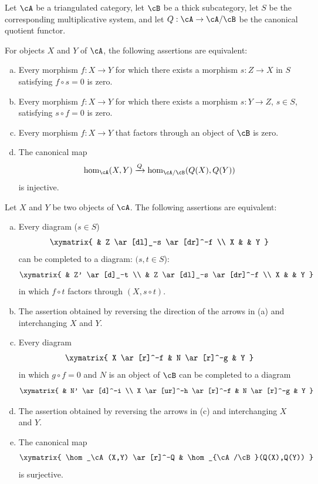 Let $\cA$ be a triangulated category, let $\cB$ be a thick subcategory,
let $S$ be the corresponding multiplicative system, and let
$Q:\cA\to \cA/\cB$ be the canonical quotient functor.

\begin{proposition}\label{VIII:2-5-1}
For objects $X$ and $Y$ of $\cA$, the following assertions are equivalent:
\begin{enumerate}[(a)]
  \item Every morphism $f:X\to Y$ for which there exists a morphism
    $s:Z\to X$ in $S$ satisfying $f\circ s=0$ is zero.
  \item Every morphism $f:X\to Y$ for which there exists a morphism
    $s:Y\to Z$, $s\in S$, satisfying $s\circ f=0$ is zero.
  \item Every morphism $f:X\to Y$ that factors through an object of $\cB$
    is zero.
  \item The canonical map
    \[
      \hom_\cA(X,Y) \xrightarrow{Q} \hom_{\cA/\cB}(Q(X),Q(Y))
    \]
    is injective.
\end{enumerate}
\end{proposition}

\begin{proposition}\label{VIII:2-5-2}
Let $X$ and $Y$ be two objects of $\cA$. The following assertions are
equivalent:
\begin{enumerate}[(a)]
  \item Every diagram ($s\in S$)
    \[\xymatrix{
      & Z \ar[dl]_-s \ar[dr]^-f \\
      X
        & & Y
    }\]
    can be completed to a diagram: $(s,t\in S$):
    \[\xymatrix{
      & Z' \ar[d]_-t \\
      & Z \ar[dl]_-s \ar[dr]^-f \\
      X
        & & Y
    }\]
    in which $f\circ t$ factors through $(X,s\circ t)$.
  \item The assertion obtained by reversing the direction of the arrows in
    (a) and interchanging $X$ and $Y$.
  \item Every diagram
    \[\xymatrix{
      X \ar[r]^-f
        & N \ar[r]^-g
        & Y
    }\]
    in which $g\circ f=0$ and $N$ is an object of $\cB$ can be completed
    to a diagram
    \[\xymatrix{
      & N' \ar[d]^-i \\
      X \ar[ur]^-h \ar[r]^-f
        & N \ar[r]^-g
        & Y
    }\]
  \item The assertion obtained by reversing the arrows in (c) and
    interchanging $X$ and $Y$.
  \item The canonical map
    \[\xymatrix{
      \hom_\cA(X,Y) \ar[r]^-Q
        & \hom_{\cA/\cB}(Q(X),Q(Y))
    }\]
    is surjective.
\end{enumerate}
\end{proposition}

